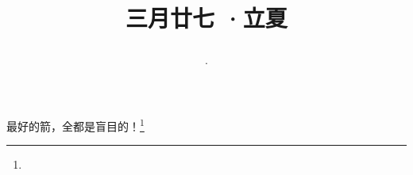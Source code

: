 \title{\date[d=5,m=5,y=2024][year:cn-y,年,month:cn,day:cn,日,·,weekday]·三月廿七 ·立夏}
最好的箭，全都是盲目的！\footnote{ }

